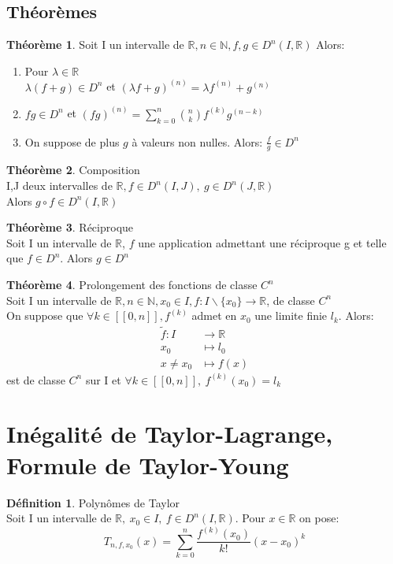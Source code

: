 \documentclass[fleqn]{article}
\theoremstyle{definition} \newtheorem*{defi}{D\'efinition}
\theoremstyle{definition} \newtheorem*{theo}{Th\'eor\`eme}
\theoremstyle{remark} \newtheorem*{rqs}{Remarques}
\theoremstyle{definition} \newtheorem*{prop}{Propri\'et\'e}
\begin{document}
\subsection{Th\'eor\`emes}
\begin{theo}
	Soit I un intervalle de $\mathbb{R}, n \in \mathbb{N}, f,g \in D^n(I, \mathbb{R})$ Alors:
	\begin{enumerate}
		\item Pour $\lambda \in \mathbb{R}$ \\
			$\lambda (f + g) \in D^n$ et $(\lambda f + g)^{(n)} = \lambda f^{(n)} + g^{(n)}$
		\item $fg \in D^n$ et $(fg)^{(n)} = \sum_{k=0}^{n} \binom{n}{k} f^{(k)} g ^{(n-k)}$
		\item On suppose de plus $g$ \`a valeurs non nulles. Alors: $\frac{f}{g} \in D^n$
	\end{enumerate}
\end{theo}

\begin{theo} Composition\\
	I,J deux intervalles de $\mathbb{R}, f \in D^n(I, J),\ g \in D^n(J, \mathbb{R})$\\
	Alors $g \circ f \in D^n(I, \mathbb{R})$
\end{theo}

\begin{theo} R\'eciproque\\
	Soit I un intervalle de $\mathbb{R}$, $f$ une application admettant une r\'eciproque g et telle que $f \in D^n$. Alors $g \in D^n$
\end{theo}

\begin{theo} Prolongement des fonctions de classe $C^n$\\
	Soit I un intervalle de $\mathbb{R}, n \in \mathbb{N}, x_0 \in I, f:I\backslash\{x_0\} \rightarrow \mathbb{R}$, de classe $C^n$ \\
	On suppose que $\forall k \in [\![0,n]\!], f^{(k)}$ admet en $x_0$ une limite finie $l_k$. Alors:
	\begin{align*}
		\tilde{f}: I &\rightarrow \mathbb{R}\\
		x_0 &\mapsto l_0\\
		x \neq x_0 &\mapsto f(x)
	\end{align*}
	est de classe $C^n$ sur I et $\forall k \in [\![0,n]\!],\ f^{(k)}(x_0) = l_k$
\end{theo}

\section{In\'egalit\'e de Taylor-Lagrange, Formule de Taylor-Young}
\begin{defi} Polyn\^omes de Taylor \\
	Soit I un intervalle de $\mathbb{R},\ x_0 \in I,\ f \in D^n(I, \mathbb{R})$. Pour $x \in \mathbb{R}$ on pose:
	\[T_{n,f,x_0}(x) = \sum_{k=0}^{n} \frac{f^{(k)}(x_0)}{k!}(x-x_0)^k\]
\end{defi}
\end{document}
